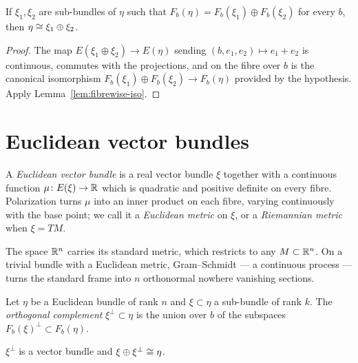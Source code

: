 \begin{lemma}\label{lem:internal-sum}
If $\xi_1,\xi_2$ are sub-bundles of $\eta$ such that
$F_b(\eta)=F_b(\xi_1)\oplus F_b(\xi_2)$ for every $b$, then
$\eta\cong\xi_1\oplus\xi_2$.
\end{lemma}

\begin{proof}
The map $E(\xi_1\oplus\xi_2)\to E(\eta)$ sending $(b,e_1,e_2)\mapsto e_1+e_2$ is
continuous, commutes with the projections, and on the fibre over $b$ is the
canonical isomorphism $F_b(\xi_1)\oplus F_b(\xi_2)\to F_b(\eta)$ provided by the
hypothesis. Apply Lemma~\ref{lem:fibrewise-iso}.
\end{proof}

\section{Euclidean vector bundles}

\begin{definition}
A \emph{Euclidean vector bundle} is a real vector bundle $\xi$ together with a
continuous function $\mu\colon E(\xi)\to\mathbb{R}$ which is quadratic and positive
definite on every fibre. Polarization turns $\mu$ into an inner product on each
fibre, varying continuously with the base point; we call it a \emph{Euclidean
metric} on $\xi$, or a \emph{Riemannian metric} when $\xi=TM$.
\end{definition}

The space $\mathbb{R}^n$ carries its standard metric, which restricts to any
$M\subset\mathbb{R}^n$. On a trivial bundle with a Euclidean metric, Gram--Schmidt --- a
continuous process --- turns the standard frame into $n$ orthonormal nowhere
vanishing sections.

\begin{definition}
Let $\eta$ be a Euclidean bundle of rank $n$ and $\xi\subset\eta$ a sub-bundle
of rank $k$. The \emph{orthogonal complement} $\xi^\perp\subset\eta$ is the
union over $b$ of the subspaces $F_b(\xi)^\perp\subset F_b(\eta)$.
\end{definition}

\begin{theorem}\label{thm:orthogonal-complement}
$\xi^\perp$ is a vector bundle and $\xi\oplus\xi^\perp\cong\eta$.
\end{theorem}

